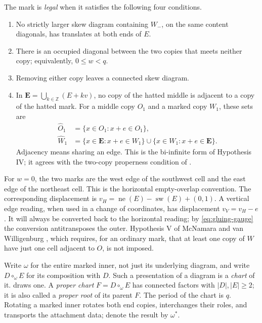 \documentclass[11pt,a4paper]{amsart}
\numberwithin{equation}{section}
\theoremstyle{plain}
\theoremstyle{definition}
\newcommand{\Z}{\mathbb Z}
\begin{document}
The mark is \emph{legal} when it satisfies the following four conditions.
\begin{enumerate}
\item[(I)] No strictly larger skew diagram containing \(W_-\), on the same content diagonals, has translates at both ends of \(E\).
\item[(II)] There is an occupied diagonal between the two copies that meets neither copy; equivalently, \(0\le w<q\).
\item[(III)] Removing either copy leaves a connected skew diagram.
\item[(IV)] In \(\boldsymbol E=\bigcup_{k\in\Z}(E+kv)\), no copy of the hatted middle is adjacent to a copy of the hatted mark.  For a middle copy \(O_1\) and a marked copy \(W_1\), these sets are
\begin{equation*}
 \begin{split}
 \widehat O_1&=\{x\in O_1:x+e\in O_1\},\\
 \widehat W_1&=\{x\in\boldsymbol E:x+e\in W_1\}
             \cup\{x\in W_1:x+e\in\boldsymbol E\}.
 \end{split}
\end{equation*}
Adjacency means sharing an edge.  This is the bi-infinite form of Hypothesis IV; it agrees with the two-copy properness condition of \cite[Rem.~5.3.6]{OlsonHarris2024HopfApplications}.
\end{enumerate}
For \(w=0\), the two marks are the west edge of the southwest cell and the east edge of the northeast cell.  This is the horizontal empty-overlap convention.  The corresponding displacement is \(v_H=\operatorname{ne}(E)-\operatorname{sw}(E)+(0,1)\).  A vertical edge reading, when used in a change of coordinates, has displacement \(v_V=v_H-e\).  It will always be converted back to the horizontal reading; by \eqref{eq:gluing-gauge} the conversion antitransposes the outer.  Hypothesis V of McNamara and van Willigenburg \cite[Hyp.~3.27]{McNamara2009Classification}, which requires, for an ordinary mark, that at least one copy of \(W\) have just one cell adjacent to \(O\), is not imposed.

Write \(\omega\) for the entire marked inner, not just its underlying diagram, and write \(D\circ_\omega E\) for its composition with \(D\).  Such a presentation of a diagram is a \emph{chart} of it.   draws one.  A \emph{proper chart} \(F=D\circ_\omega E\) has connected factors with \(|D|,|E|\ge2\); it is also called a \emph{proper root} of its parent \(F\).  The period of the chart is \(q\).  Rotating a marked inner rotates both end copies, interchanges their roles, and transports the attachment data; denote the result by \(\omega^*\).
\end{document}
